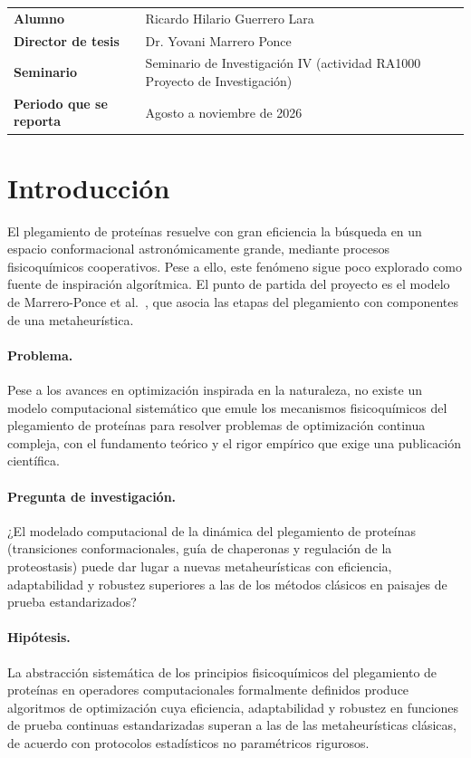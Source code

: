 \documentclass[11pt,letterpaper]{article}
\begin{document}
\vspace{4pt}
\noindent\begin{tabularx}{\textwidth}{@{}lX@{}}
\textbf{Alumno} & Ricardo Hilario Guerrero Lara \\
\textbf{Director de tesis} & Dr. Yovani Marrero Ponce \\
\textbf{Seminario} & Seminario de Investigación IV (actividad RA1000 Proyecto de Investigación) \\
\textbf{Periodo que se reporta} & Agosto a noviembre de 2026 \\
\end{tabularx}

\section{Introducción}

El plegamiento de proteínas resuelve con gran eficiencia la búsqueda en un espacio conformacional astronómicamente grande, mediante procesos fisicoquímicos cooperativos. Pese a ello, este fenómeno sigue poco explorado como fuente de inspiración algorítmica. El punto de partida del proyecto es el modelo de Marrero-Ponce et al.~\cite{marrero2021}, que asocia las etapas del plegamiento con componentes de una metaheurística.

\paragraph{Problema.} Pese a los avances en optimización inspirada en la naturaleza, no existe un modelo computacional sistemático que emule los mecanismos fisicoquímicos del plegamiento de proteínas para resolver problemas de optimización continua compleja, con el fundamento teórico y el rigor empírico que exige una publicación científica.

\paragraph{Pregunta de investigación.} ¿El modelado computacional de la dinámica del plegamiento de proteínas (transiciones conformacionales, guía de chaperonas y regulación de la proteostasis) puede dar lugar a nuevas metaheurísticas con eficiencia, adaptabilidad y robustez superiores a las de los métodos clásicos en paisajes de prueba estandarizados?

\paragraph{Hipótesis.} La abstracción sistemática de los principios fisicoquímicos del plegamiento de proteínas en operadores computacionales formalmente definidos produce algoritmos de optimización cuya eficiencia, adaptabilidad y robustez en funciones de prueba continuas estandarizadas superan a las de las metaheurísticas clásicas, de acuerdo con protocolos estadísticos no paramétricos rigurosos.
\end{document}
